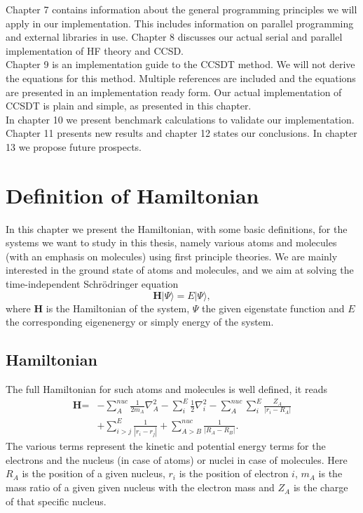 \documentclass[a4paper,norsk,11pt,twoside]{report}
\begin{document}
Chapter 7 contains information about the general programming
principles we will apply in our implementation. This includes
information on parallel programming and external libraries in
use. Chapter 8 discusses our actual serial and parallel
implementation of HF theory and CCSD.\\

Chapter 9 is an implementation guide to the CCSDT method. We will not
derive the equations for this method. Multiple references are included
and the equations are presented in an implementation ready form. Our
actual implementation of CCSDT is plain and simple, as presented
in this chapter. \\

In chapter 10 we present benchmark calculations to validate our
implementation. Chapter 11 presents new results and chapter 12 states our
conclusions. In chapter 13 we propose future prospects. 



\chapter{Definition of Hamiltonian}

In this chapter we present the Hamiltonian, with some basic definitions, for the systems we want to
study in this thesis, namely various atoms and molecules (with an emphasis on molecules) 
using first principle theories. We are mainly
interested in the ground state of atoms and molecules, and we aim at 
solving the time-independent Schr\"odringer equation
\begin{equation}
\textbf{H} |\Psi \rangle = E |\Psi \rangle,
\end{equation}
where $\textbf{H}$ is the Hamiltonian of the system, $\Psi$ the given eigenstate function and $E$ the corresponding
eigenenergy or simply energy  of the system. 

\section{Hamiltonian}
The full Hamiltonian for such atoms and molecules  is well defined, it reads
\begin{align}
\textbf{H} = &
- \sum_A^{nuc} \frac{1}{2m_A} \nabla_A^2
- \sum_i^E \frac{1}{2} \nabla_i^2
- \sum_A^{nuc} \sum_i^E \frac{Z_A}{|r_i - R_A|}
\nonumber \\ &
+ \sum_{i>j}^E \frac{1}{|r_i - r_j|}
+ \sum_{A>B}^{nuc} \frac{1}{|R_A - R_B|}.
\end{align}
The various terms represent the kinetic and potential energy terms for the electrons and the nucleus (in case of atoms) or nuclei in case of molecules. Here $R_A$ is the position of a given nucleus, $r_i$ is the position of electron $i$, $m_A$ is the mass ratio of a given given nucleus with the electron mass and $Z_A$ is the charge of that specific nucleus.
\end{document}
